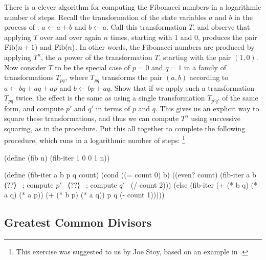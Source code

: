 \begin{exercise}
	\label{Exercise 1.19}
	There is a clever algorithm for computing the Fibonacci numbers in a logarithmic number of steps.
	Recall the transformation of the state variables \( a \) and \( b \) in the  process of :
	\( a \gets a + b \) and \( b \gets a \).
	Call this transformation \( T \), and observe that applying \( T \) over and over again \( n \) times, starting with \( 1 \) and \( 0 \), produces the pair \( \operatorname{Fib} (n + 1) \) and \( \operatorname{Fib}(n) \).
	In other words, the Fibonacci numbers are produced by applying \( T^n \), the \( n \) power of the transformation \( T \), starting with the pair \( (1, 0) \).
	Now consider \( T \) to be the special case of \( p = 0 \) and \( q = 1 \) in a family of transformations \( T_{pq} \), where \( T_{pq} \) transforms the pair \( (a, b) \) according to \( a \gets bq + aq + ap \) and \( b \gets bp + aq \).
	Show that if we apply such a transformation \( T_{pq} \) twice, the effect is the same as using a single transformation \( T_{p' q'} \) of the same form, and compute \( p'\) and \( q' \) in terms of \( p \) and \( q \).
	This gives us an explicit way to square these transformations, and thus we can compute \( T^n \) using successive squaring, as in the  procedure.
	Put this all together to complete the following procedure, which runs in a logarithmic number of steps:%
	\footnote{
		This exercise was suggested to us by Joe Stoy, based on an example in .
	}
	\begin{scheme}
	  (define (fib n)
	    (fib-iter 1 0 0 1 n))

	  (define (fib-iter a b p q count)
	    (cond ((= count 0) b)
	          ((even? count)
	           (fib-iter a
	                     b
	                     ⟨??⟩   ~\textrm{; compute \( p' \)}~
	                     ⟨??⟩   ~\textrm{; compute \( q' \)}~
	                     (/ count 2)))
	          (else (fib-iter (+ (* b q) (* a q) (* a p))
	                          (+ (* b p) (* a q))
	                          p
	                          q
	                          (- count 1)))))
	\end{scheme}
\end{exercise}



\subsection{Greatest Common Divisors}
\label{Section 1.2.5}

